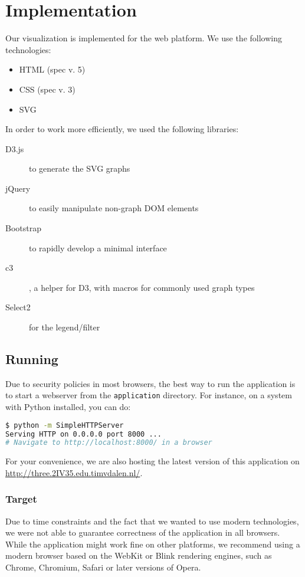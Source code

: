 \section{Implementation}\label{Sec:Imp}

	Our visualization is implemented for the web platform.
	We use the following technologies:

	\begin{itemize}
		\item HTML (spec v. 5)
		\item CSS (spec v. 3)
		\item SVG
	\end{itemize}

	In order to work more efficiently, we used the following libraries:

	\begin{description}
		\item[D3.js] to generate the SVG graphs
		\item[jQuery] to easily manipulate non-graph DOM elements
		\item[Bootstrap] to rapidly develop a minimal interface
		\item[c3], a helper for D3, with macros for commonly used graph types
		\item[Select2] for the legend/filter
	\end{description}

	\subsection{Running}
		Due to security policies in most browsers, the best way to run the application is to start a webserver from the \texttt{application} directory.
		For instance, on a system with Python installed, you can do:

		\begin{lstlisting}[language=bash]
$ python -m SimpleHTTPServer
Serving HTTP on 0.0.0.0 port 8000 ...
# Navigate to http://localhost:8000/ in a browser
		\end{lstlisting}

		For your convenience, we are also hosting the latest version of this application on \url{http://three.2IV35.edu.timvdalen.nl/}.

		\subsubsection{Target}
			Due to time constraints and the fact that we wanted to use modern technologies, we were not able to guarantee correctness of the application in all browsers.
			While the application might work fine on other platforms, we recommend using a modern browser based on the WebKit or Blink rendering engines, such as Chrome, Chromium, Safari or later versions of Opera.


